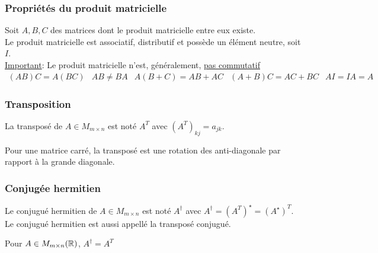 \subsubsection{Propriétés du produit matricielle}
Soit $A, B, C$ des matrices dont le produit matricielle entre eux existe. \\
Le produit matricielle est associatif, distributif et possède un élément neutre, soit $I$. \\
\underline{Important}: Le produit matricielle n'est, généralement, \underline{pas commutatif}
\[
    \begin{matrix}
        (AB)C = A(BC) & AB \neq BA & A(B + C) = AB + AC & (A + B)C = AC + BC & AI = IA = A
    \end{matrix}
\]

\subsubsection{Transposition}
\begin{definition}
    La transposé de $A \in M_{m \times n}$ est noté $A^T$ avec $\left(A^T\right)_{kj} = a_{jk}$.
    \begin{remark}
        Pour une matrice carré, la transposé est une rotation des anti-diagonale par rapport à la grande diagonale.
    \end{remark}
\end{definition}

\subsubsection{Conjugée hermitien}
\begin{definition}
    Le conjugué hermitien de $A \in M_{m \times n}$ est noté $A^\dagger$ avec $A^\dagger = \left(A^T\right)^\star = \left(A^\star\right)^T$.
    Le conjugué hermitien est aussi appellé la transposé conjugué.
    \begin{remark}
        Pour $A \in M_{m \times n}(\mathbb{R})$, $A^\dagger = A^T$
    \end{remark}
\end{definition}

